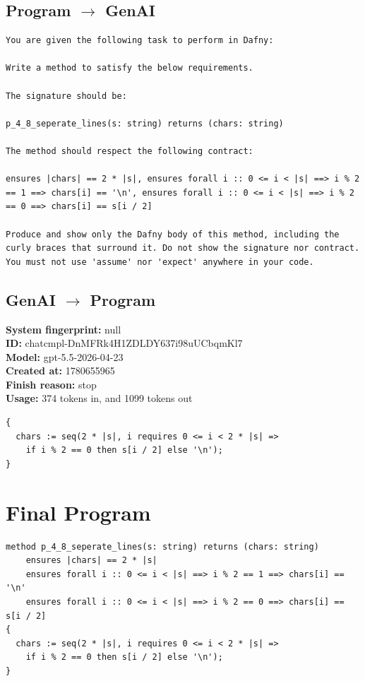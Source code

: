 \documentclass{article}
\begin{document}
\subsection*{Program $\rightarrow$ GenAI}
\begin{lstlisting}
You are given the following task to perform in Dafny:

Write a method to satisfy the below requirements.

The signature should be:

p_4_8_seperate_lines(s: string) returns (chars: string)

The method should respect the following contract:

ensures |chars| == 2 * |s|, ensures forall i :: 0 <= i < |s| ==> i % 2 == 1 ==> chars[i] == '\n', ensures forall i :: 0 <= i < |s| ==> i % 2 == 0 ==> chars[i] == s[i / 2]

Produce and show only the Dafny body of this method, including the curly braces that surround it. Do not show the signature nor contract. You must not use 'assume' nor 'expect' anywhere in your code.
\end{lstlisting}
\subsection*{GenAI $\rightarrow$ Program}
\textbf{System fingerprint: }null
\\\textbf{ID: }chatcmpl-DnMFRk4H1ZDLDY637i98uUCbqmKl7
\\\textbf{Model: }gpt-5.5-2026-04-23
\\\textbf{Created at: }1780655965
\\\textbf{Finish reason: }stop
\\\textbf{Usage: }374 tokens in, and 1099 tokens out
\begin{lstlisting}
{
  chars := seq(2 * |s|, i requires 0 <= i < 2 * |s| =>
    if i % 2 == 0 then s[i / 2] else '\n');
}
\end{lstlisting}
\section*{Final Program}
\begin{lstlisting}
method p_4_8_seperate_lines(s: string) returns (chars: string)
	ensures |chars| == 2 * |s|
	ensures forall i :: 0 <= i < |s| ==> i % 2 == 1 ==> chars[i] == '\n'
	ensures forall i :: 0 <= i < |s| ==> i % 2 == 0 ==> chars[i] == s[i / 2]
{
  chars := seq(2 * |s|, i requires 0 <= i < 2 * |s| =>
    if i % 2 == 0 then s[i / 2] else '\n');
}
\end{lstlisting}
\end{document}
